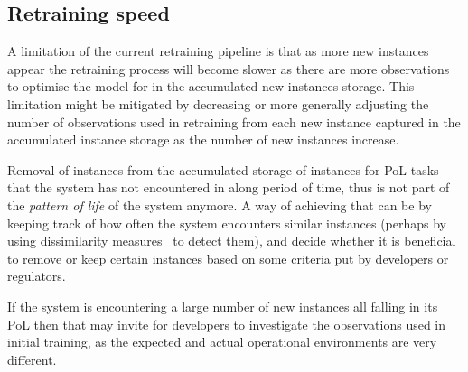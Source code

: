 %
%

\subsection{Retraining speed}
A limitation of the current retraining pipeline is that as more new instances appear the retraining process will become slower as there are more observations to optimise the model for in the accumulated new instances storage.
%
This limitation might be mitigated by decreasing or more generally adjusting the number of observations used in retraining from each new instance captured in the accumulated instance storage as the number of new instances increase.

Removal of instances from the accumulated storage of instances for PoL tasks that the system has not encountered in along period of time, thus is not part of the \textit{pattern of life} of the system anymore.
%
%
%
A way of achieving that can be by keeping track of how often the system encounters similar instances (perhaps by using dissimilarity measures~\cite{Hond2020} to detect them), and decide whether it is beneficial to remove or keep certain instances based on some criteria put by developers or regulators. 

If the system is encountering a large number of new instances all falling in its PoL then that may invite for developers to investigate the observations used in initial training, as the expected and actual operational environments are very different. 

